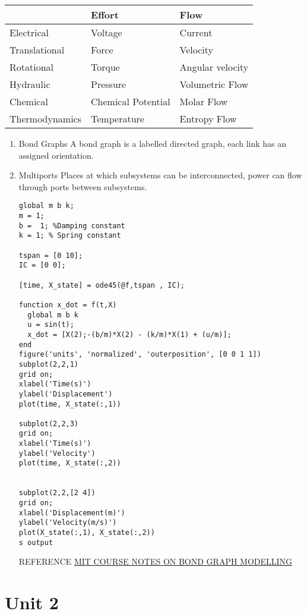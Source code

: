 \documentclass[11pt]{report}
\begin{document}
\begin{center}
\begin{tabular}{lll}
\hline
 & Effort & Flow\\
\hline
Electrical & Voltage & Current\\
Translational & Force & Velocity\\
Rotational & Torque & Angular velocity\\
Hydraulic & Pressure & Volumetric Flow\\
Chemical & Chemical Potential & Molar Flow\\
Thermodynamics & Temperature & Entropy Flow\\
\hline
\end{tabular}
\end{center}
\begin{enumerate}
\item Bond Graphs
\label{sec:org2a215e1}
A bond graph is a labelled directed graph, each link has an assigned orientation.
\item Multiports
\label{sec:org8eb8fa0}
Places at which subsystems can be interconnected, power can flow through ports between subsystems.

\begin{verbatim}
global m b k;
m = 1;
b =  1; %Damping constant
k = 1; % Spring constant

tspan = [0 10];
IC = [0 0];

[time, X_state] = ode45(@f,tspan , IC);

function x_dot = f(t,X)
  global m b k
  u = sin(t);
  x_dot = [X(2);-(b/m)*X(2) - (k/m)*X(1) + (u/m)];
end
figure('units', 'normalized', 'outerposition', [0 0 1 1])
subplot(2,2,1)
grid on;
xlabel('Time(s)')
ylabel('Displacement')
plot(time, X_state(:,1))

subplot(2,2,3)
grid on;
xlabel('Time(s)')
ylabel('Velocity')
plot(time, X_state(:,2))


subplot(2,2,[2 4])
grid on;
xlabel('Displacement(m)')
ylabel('Velocity(m/s)')
plot(X_state(:,1), X_state(:,2))
s output
\end{verbatim}


REFERENCE
\href{https://ocw.mit.edu/courses/2-141-modeling-and-simulation-of-dynamic-systems-fall-2006/71ca8916669d0aa6839ce780db9f5288\_bond\_graph\_intro.pdf}{MIT COURSE NOTES ON BOND GRAPH MODELLING}
\end{enumerate}
\chapter{Unit 2}
\label{sec:orgf01e0c2}
\end{document}
